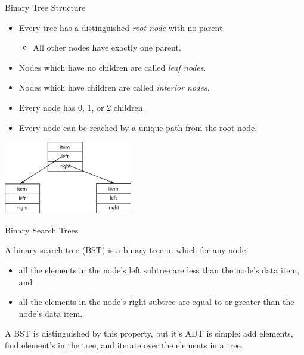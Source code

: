 \documentclass{beamer}
\begin{document}
\begin{frame}[fragile]{Binary Tree Structure}



\begin{itemize}
\item Every tree has a distinguished {\it root node} with no parent.
\begin{itemize}
\item All other nodes have exactly one parent.
\end{itemize}
\item Nodes which have no children are called {\it leaf nodes}.
\item Nodes which have children are called {\it interior nodes}.
\item Every node has 0, 1, or 2 children.
\item Every node can be reached by a unique path from the root node.
\end{itemize}

\begin{center}
\includegraphics[height=1.25in]{binary-tree.png}
\end{center}


\end{frame}

\begin{frame}[fragile]{Binary Search Trees}


A binary search tree (BST) is a binary tree in which for any node,  
\begin{itemize}
\item all the elements in the node's left subtree are less than the node's data item, and
\item all the elements in the node's right subtree are equal to or greater than the node's data item.
\end{itemize}

A BST is distinguished by this property, but it's ADT is simple: add elements, find element's in the tree, and iterate over the elements in a tree.


\end{frame}
\end{document}
